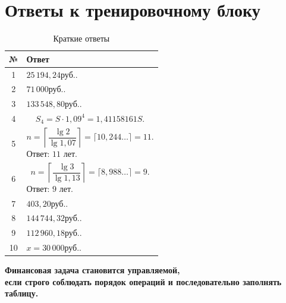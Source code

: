 \documentclass[a4paper,12pt]{article}
\newcommand{\RUB}{\text{руб.}}
\begin{document}
\clearpage
\section*{Ответы к тренировочному блоку}

\begin{table}[ht]
\centering
\caption{Краткие ответы}
\begin{tabularx}{\linewidth}{@{}cX@{}}
\toprule
\textbf{№} & \textbf{Ответ} \\
\midrule

1 &
\(25\,194{,}24\RUB\). \\

2 &
\(71\,000\RUB\). \\

3 &
\(133\,548{,}80\RUB\). \\

4 &
\[
S_4=S\cdot1{,}09^4=1{,}41158161S.
\]
\\

5 &
\[
n=\left\lceil\frac{\lg2}{\lg1{,}07}\right\rceil
=\lceil10{,}244\ldots\rceil=11.
\]
Ответ: \(11\) лет. \\

6 &
\[
n=\left\lceil\frac{\lg3}{\lg1{,}13}\right\rceil
=\lceil8{,}988\ldots\rceil=9.
\]
Ответ: \(9\) лет. \\

7 &
\(403{,}20\RUB\). \\

8 &
\(144\,744{,}32\RUB\). \\

9 &
\(112\,960{,}18\RUB\). \\

10 &
\(x=30\,000\RUB\). \\

\bottomrule
\end{tabularx}
\end{table}

\vfill

\begin{center}
\color{darkaccent}
\textbf{Финансовая задача становится управляемой,\\
если строго соблюдать порядок операций и последовательно заполнять таблицу.}
\end{center}
\end{document}
